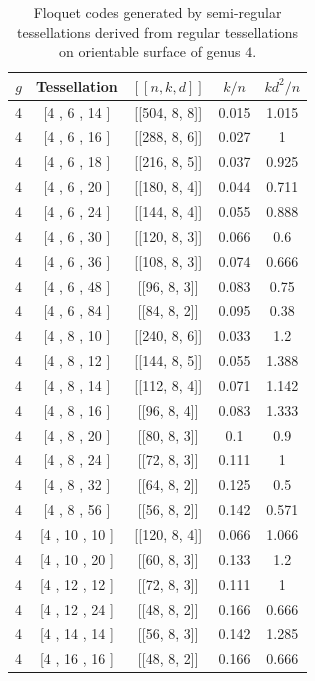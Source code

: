 \documentclass[%
reprint,
amsmath,amssymb,
aps,
]{revtex4-2}
\begin{document}
\begin{table}[b]
	\caption{\label{tab6}
		Floquet codes generated by semi-regular tessellations derived from regular tessellations on orientable surface of genus $4$.}
	\begin{ruledtabular}
		\begin{tabular}{|c|c|c|c|c|}
			$g$ & Tessellation & $[[n,k,d]]$ & $k/n$ & $kd^{2}/n$ \\ \hline
	4 & [4 , 6 , 14 ] & [[504, 8, 8]] & 0.015 & 1.015  \\
	4 & [4 , 6 , 16 ] & [[288, 8, 6]] & 0.027 & 1  \\
	4 & [4 , 6 , 18 ] & [[216, 8, 5]] & 0.037 & 0.925  \\
	4 & [4 , 6 , 20 ] & [[180, 8, 4]] & 0.044 & 0.711  \\
	4 & [4 , 6 , 24 ] & [[144, 8, 4]] & 0.055 & 0.888  \\
	4 & [4 , 6 , 30 ] & [[120, 8, 3]] & 0.066 & 0.6  \\
	4 & [4 , 6 , 36 ] & [[108, 8, 3]] & 0.074 & 0.666  \\
	4 & [4 , 6 , 48 ] & [[96, 8, 3]] & 0.083 & 0.75  \\
	4 & [4 , 6 , 84 ] & [[84, 8, 2]] & 0.095 & 0.38  \\
	4 & [4 , 8 , 10 ] & [[240, 8, 6]] & 0.033 & 1.2  \\
	4 & [4 , 8 , 12 ] & [[144, 8, 5]] & 0.055 & 1.388  \\
	4 & [4 , 8 , 14 ] & [[112, 8, 4]] & 0.071 & 1.142  \\
	4 & [4 , 8 , 16 ] & [[96, 8, 4]] & 0.083 & 1.333  \\
	4 & [4 , 8 , 20 ] & [[80, 8, 3]] & 0.1 & 0.9   \\
	4 & [4 , 8 , 24 ] & [[72, 8, 3]] & 0.111 & 1  \\
	4 & [4 , 8 , 32 ] & [[64, 8, 2]] & 0.125 & 0.5  \\
	4 & [4 , 8 , 56 ] & [[56, 8, 2]] & 0.142 & 0.571  \\
	4 & [4 , 10 , 10 ] & [[120, 8, 4]] & 0.066 & 1.066 \\
	4 & [4 , 10 , 20 ] & [[60, 8, 3]] & 0.133 & 1.2  \\
	4 & [4 , 12 , 12 ] & [[72, 8, 3]] & 0.111 & 1   \\
	4 & [4 , 12 , 24 ] & [[48, 8, 2]] & 0.166 & 0.666   \\
	4 & [4 , 14 , 14 ] & [[56, 8, 3]] & 0.142 & 1.285  \\
	4 & [4 , 16 , 16 ] & [[48, 8, 2]] & 0.166 & 0.666   \\

\end{tabular}
\end{ruledtabular}
\end{table}
\end{document}
